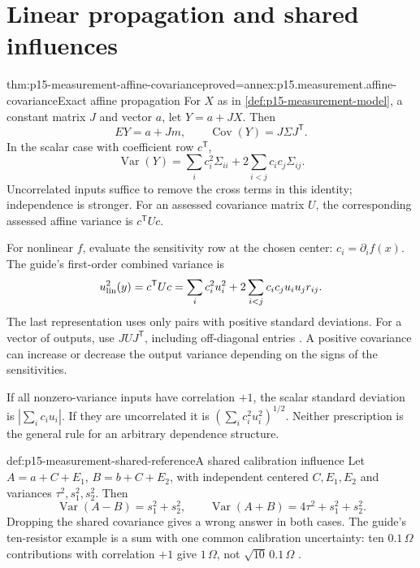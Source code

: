 \section{Linear propagation and shared influences}
\label{sec:p15-measurement-linear}

\begin{hbtheorem}{thm:p15-measurement-affine-covariance}{proved=annex:p15.measurement.affine-covariance}{Exact affine propagation}
For \(X\) as in \cref{def:p15-measurement-model}, a constant matrix \(J\)
and vector \(a\), let \(Y=a+JX\). Then
\[
 EY=a+Jm,\qquad \operatorname{Cov}(Y)=J\Sigma J^{\mathsf T}.
\]
In the scalar case with coefficient row \(c^{\mathsf T}\),
\[
 \operatorname{Var}(Y)=\sum_i c_i^2\Sigma_{ii}
       +2\sum_{i<j}c_i c_j\Sigma_{ij}.
\]
Uncorrelated inputs suffice to remove the cross terms in this identity;
independence is stronger. For an assessed covariance matrix \(U\), the
corresponding assessed affine variance is \(c^{\mathsf T}Uc\).
\end{hbtheorem}

For nonlinear \(f\), evaluate the sensitivity row at the chosen center:
\(c_i=\partial_i f(x)\). The guide's first-order combined variance is
\[
 u_{\rm lin}^2(y)=c^{\mathsf T}Uc
   =\sum_i c_i^2u_i^2+2\sum_{i<j}c_i c_j u_i u_j r_{ij}.
\]
The last representation uses only pairs with positive standard deviations.
For a vector of outputs, use \(JUJ^{\mathsf T}\), including off-diagonal
entries \cite[5.1--5.2, H.2]{JCGM1002008EMeasurement}.
A positive covariance can increase or decrease the output variance depending
on the signs of the sensitivities.

If all nonzero-variance inputs have correlation \(+1\), the scalar standard
deviation is \(\left|\sum_i c_i u_i\right|\). If they are uncorrelated it
is \((\sum_i c_i^2u_i^2)^{1/2}\). Neither prescription is the general rule
for an arbitrary dependence structure.

\begin{hbexample}{def:p15-measurement-shared-reference}{A shared calibration influence}
Let \(A=a+C+E_1\), \(B=b+C+E_2\), with independent centered \(C,E_1,E_2\)
and variances \(\tau^2,s_1^2,s_2^2\). Then
\[
 \operatorname{Var}(A-B)=s_1^2+s_2^2,\qquad
 \operatorname{Var}(A+B)=4\tau^2+s_1^2+s_2^2.
\]
Dropping the shared covariance gives a wrong answer in both cases.
The guide's ten-resistor example is a sum with one common calibration
uncertainty: ten \(0.1\,\Omega\) contributions with correlation \(+1\)
give \(1\,\Omega\), not \(\sqrt{10}\,0.1\,\Omega\)
\cite[5.2.2]{JCGM1002008EMeasurement}.
\end{hbexample}

